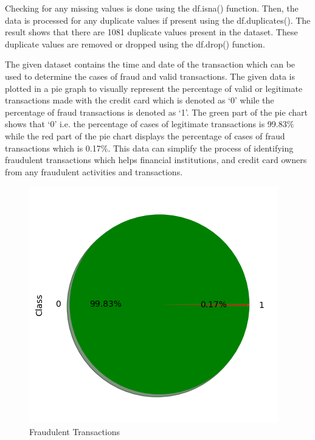 Checking for any missing values is done using the df.isna() function. Then, the data is processed for any duplicate values if present using the df.duplicates(). The result shows that there are 1081 duplicate values present in the dataset. These duplicate values are removed or dropped using the df.drop() function.

The given dataset contains the time and date of the transaction which can be used to determine the cases of fraud and valid transactions. The given data is plotted in a pie graph to visually represent the percentage of valid or legitimate transactions made with the credit card which is denoted as ‘0’ while the percentage of fraud transactions is denoted as ‘1’. The green part of the pie chart shows that ‘0’ i.e. the percentage of cases of legitimate transactions is 99.83\% while the red part of the pie chart displays the percentage of cases of fraud transactions which is 0.17\%. This data can simplify the process of identifying fraudulent transactions which helps financial institutions, and credit card owners from any fraudulent activities and transactions.


\begin{figure}[ht]
    \centering
    \includegraphics[scale=1]{figures/Preprocessing.png}
    \caption{Fraudulent Transactions}
    \label{fig:Data Preprocessing}
\end{figure}




